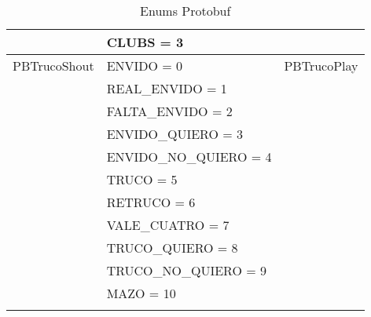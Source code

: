 \begin{longtable}{|l|l|l|}
                    & CLUBS = 3 & \\
    \hline
    PBTrucoShout & ENVIDO = 0 & PBTrucoPlay \\
                    & REAL\_ENVIDO = 1 & \\
                    & FALTA\_ENVIDO = 2 & \\
                    & ENVIDO\_QUIERO = 3 & \\
                    & ENVIDO\_NO\_QUIERO = 4 & \\
                    & TRUCO = 5 & \\
                    & RETRUCO = 6 & \\
                    & VALE\_CUATRO = 7 & \\
                    & TRUCO\_QUIERO = 8 & \\
                    & TRUCO\_NO\_QUIERO = 9 & \\
                    & MAZO = 10 & \\
    \hline
    \caption{Enums Protobuf}\\
\end{longtable}

